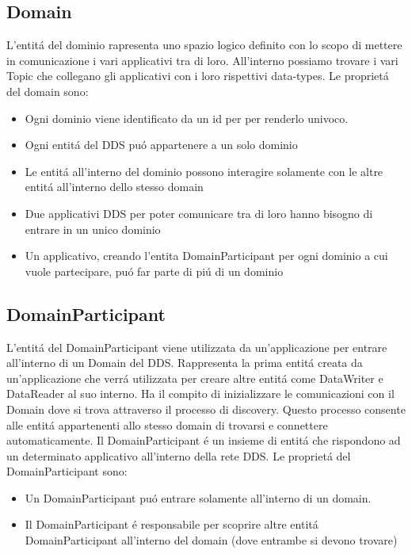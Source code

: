 \subsection{Domain}
L'entitá del dominio rapresenta uno spazio logico definito con
lo scopo di mettere in comunicazione i vari applicativi tra di loro.
All'interno possiamo trovare i vari Topic che collegano gli applicativi
con i loro rispettivi data-types.
Le proprietá del domain sono:
\begin{itemize}
    \item Ogni dominio viene identificato da un id per 
    per renderlo univoco.
    \item Ogni entitá del DDS puó appartenere
    a un solo dominio
    \item Le entitá all'interno del dominio possono interagire
    solamente con le altre entitá all'interno dello stesso domain
    \item Due applicativi DDS per poter comunicare tra di loro
    hanno bisogno di entrare in un unico dominio
    \item Un applicativo, creando l'entita DomainParticipant per ogni
    dominio a cui vuole partecipare, puó far parte di piú di un 
    dominio
\end{itemize}\cite{domainrti}


\subsection{DomainParticipant}
L'entitá del DomainParticipant viene utilizzata da un'applicazione
per entrare all'interno di un Domain del DDS. 
Rappresenta la prima entitá creata da un'applicazione che verrá 
utilizzata per creare altre entitá come DataWriter e DataReader 
al suo interno. Ha il compito di inizializzare
le comunicazioni con il Domain dove si trova attraverso 
il processo di discovery.
Questo processo consente alle entitá appartenenti allo 
stesso domain di trovarsi e connettere automaticamente.
Il DomainParticipant é un insieme di entitá che rispondono ad 
un determinato applicativo all'interno della rete DDS.
Le proprietá del DomainParticipant sono:
\begin{itemize}
    \item Un DomainParticipant puó entrare solamente all'interno
    di un domain.
    \item Il DomainParticipant é responsabile per scoprire altre
    entitá DomainParticipant all'interno del domain (dove entrambe
    si devono trovare)
\end{itemize}\cite{domainparticipantrti}


